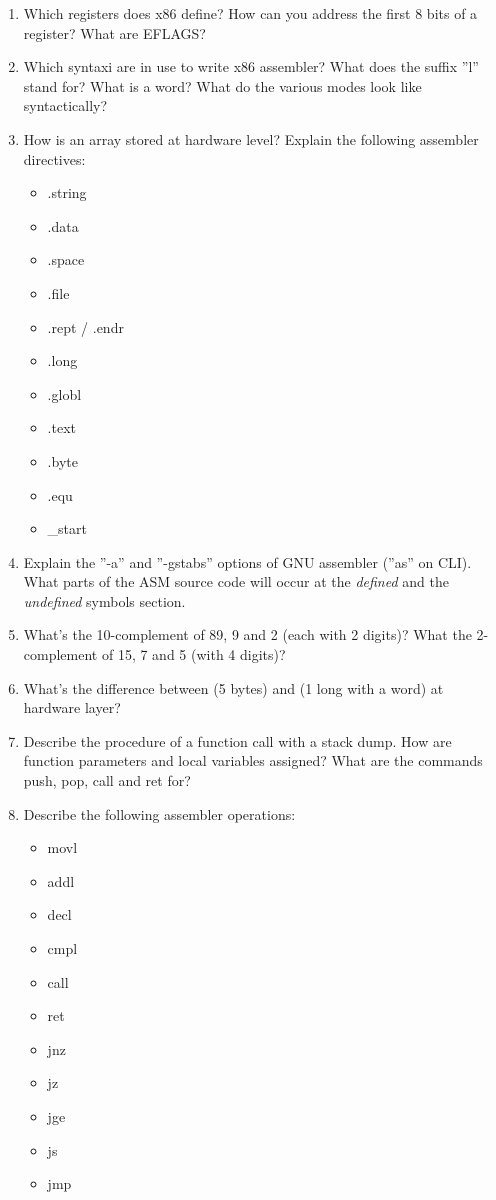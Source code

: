 \documentclass[a4paper,twocolumn]{article}
\begin{document}
\begin{enumerate}
  \item Which registers does x86 define? How can you address the first
        8 bits of a register? What are EFLAGS?
  \item Which syntaxi are in use to write x86 assembler? What does the
        suffix ''l'' stand for? What is a word? What do the various modes
        look like syntactically?
  \item How is an array stored at hardware level? Explain the following
        assembler directives:

        \begin{itemize}
          \item .string
          \item .data
          \item .space
          \item .file
          \item .rept / .endr
          \item .long
          \item .globl
          \item .text
          \item .byte
          \item .equ
          \item \_start
        \end{itemize}

  \item Explain the ''-a'' and ''-gstabs'' options of GNU assembler
        (''as'' on CLI). What parts of the ASM source code will occur
        at the \emph{defined} and the \emph{undefined} symbols section.
  \item What's the 10-complement of 89, 9 and 2 (each with 2 digits)?
        What the 2-complement of 15, 7 and 5 (with 4 digits)?
  \item What's the difference between (5 bytes) and (1 long with a word)
        at hardware layer?
  \item Describe the procedure of a function call with a stack dump.
        How are function parameters and local variables assigned?
        What are the commands push, pop, call and ret for?
  \item Describe the following assembler operations:

        \begin{itemize}
          \item movl
          \item addl
          \item decl
          \item cmpl
          \item call
          \item ret
          \item jnz
          \item jz
          \item jge
          \item js
          \item jmp
        \end{itemize}


\end{enumerate}
\end{document}
